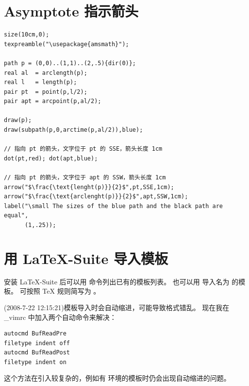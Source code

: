 \documentclass[a4paper,11pt]{article}
\begin{document}
\section{Asymptote 指示箭头}
\begin{Verbatim}
size(10cm,0);
texpreamble("\usepackage{amsmath}");

path p = (0,0)..(1,1)..(2,.5){dir(0)};
real al  = arclength(p);
real l   = length(p);
pair pt  = point(p,l/2);
pair apt = arcpoint(p,al/2);

draw(p);
draw(subpath(p,0,arctime(p,al/2)),blue);

// 指向 pt 的箭头，文字位于 pt 的 SSE，箭头长度 1cm
dot(pt,red); dot(apt,blue); 

// 指向 pt 的箭头，文字位于 apt 的 SSW，箭头长度 1cm
arrow("$\frac{\text{lenght(p)}}{2}$",pt,SSE,1cm);
arrow("$\frac{\text{arclenght(p)}}{2}$",apt,SSW,1cm);
label("\small The sizes of the blue path and the black path are equal",
      (1,.25));
\end{Verbatim}

\section{用 \LaTeX -Suite 导入模板}
安装 LaTeX{}-Suite 后可以用  命令列出已有的模板列表。%
也可以用 \mbox{} 导入名为  的模板。
 可按照 \TeX{} 规则简写为  。

(2008-7-22 12:15:21)模板导入时会自动缩进，可能导致格式错乱。
现在我在 \_vimrc 中加入两个自动命令来解决：
\begin{Verbatim}
autocmd BufReadPre
filetype indent off
autocmd BufReadPost
filetype indent on
\end{Verbatim}
这个方法在引入较复杂的，例如有  环境的模板时仍会出现自动缩进的问题。
\end{document}
